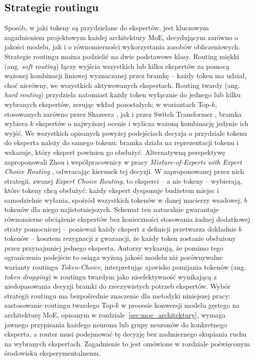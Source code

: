 \subsection{Strategie routingu}
\label{sec:moe_routing}
Sposób, w jaki tokeny są przydzielane do ekspertów, jest kluczowym zagadnieniem projektowym każdej architektury MoE, decydującym zarówno o jakości modelu, jak i o równomierności wykorzystania zasobów obliczeniowych. Strategie routingu można podzielić na dwie podstawowe klasy. Routing miękki (ang. \textit{soft routing}) łączy wyjścia wszystkich lub kilku ekspertów za pomocą ważonej kombinacji liniowej wyznaczanej przez bramkę -- każdy token ma udział, choć nierówny, we wszystkich aktywowanych ekspertach. Routing twardy (ang. \textit{hard routing}) przydziela natomiast każdy token wyłącznie do jednego lub kilku wybranych ekspertów, zerując wkład pozostałych; w wariantach Top-$k$, stosowanych zarówno przez Shazeera \cite{shazeer_2017_sparsely_gated_mixture_of_experts}, jak i przez Switch Transformer \cite{fedus_2021_switch_transformers}, bramka wybiera $k$ ekspertów o najwyższej ocenie i wylicza ważoną kombinację jedynie ich wyjść. \newline
We wszystkich opisanych powyżej podejściach decyzja o przydziale tokenu do eksperta należy do samego tokenu: bramka działa na reprezentacji tokenu i wskazuje, który ekspert powinien go obsłużyć. Alternatywną perspektywę zaproponowali Zhou i współpracownicy w pracy \textit{Mixture-of-Experts with Expert Choice Routing} \cite{zhou_2022_expert_choice_routing}, odwracając kierunek tej decyzji. W zaproponowanej przez nich strategii, zwanej \textit{Expert Choice Routing}, to eksperci -- a nie tokeny -- wybierają, które tokeny chcą obsłużyć: każdy ekspert dysponuje budżetem miejsc i samodzielnie wyłania, spośród wszystkich tokenów w danej macierzy wsadowej, $b$ tokenów dla niego najistotniejszych. Schemat ten naturalnie gwarantuje równomierne obciążenie ekspertów bez konieczności stosowania żadnej dodatkowej straty pomocniczej -- ponieważ każdy ekspert z definicji przetwarza dokładnie $b$ tokenów -- kosztem rezygnacji z gwarancji, że każdy token zostanie obsłużony przez przynajmniej jednego eksperta. Autorzy wykazują, że pomimo tego ograniczenia podejście to osiąga wyższą jakość modelu niż porównywalne warianty routingu \textit{Token-Choice}, interpretując zjawisko pomijania tokenów (ang. \textit{token dropping}) w routingu twardym jako nieefektywność wynikającą z niedopasowania decyzji bramki do rzeczywistych potrzeb ekspertów. \newline
Wybór strategii routingu ma bezpośrednie znaczenie dla metodyki niniejszej pracy: zastosowanie routingu twardego Top-$k$ w procesie konwersji modelu gęstego na architekturę MoE, opisanym w rozdziale~\ref{sec:moe_architektury}, wymaga jawnego przypisania każdego neuronu lub grupy neuronów do konkretnego eksperta, a router musi podejmować tę decyzję bez nadmiernego skupiania ruchu na wybranych ekspertach. Zagadnienie to jest omówione w rozdziale poświęconym środowisku eksperymentalnemu.


